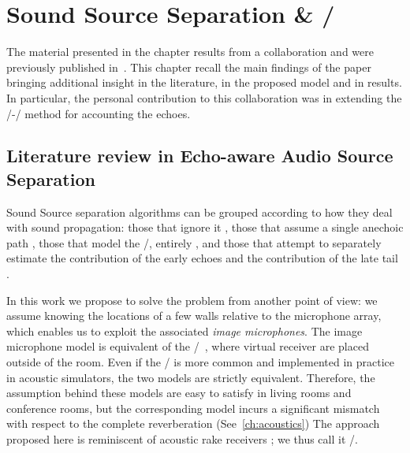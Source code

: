 \chapter{Sound Source Separation \& \SEPARAKEdef/}\label{chap:separake}

 \synopsisChSeparake

\mynewline
The material presented in the chapter results from a collaboration and were previously published in~\cite{scheibler2018separake}.
This chapter recall the main findings of the paper bringing additional insight in the literature, in the proposed model and in results.
In particular, the personal contribution to this collaboration was in extending the \EMdef/-\NMF/ method for accounting the echoes.

\section{Literature review in Echo-aware Audio Source Separation}
Sound Source separation algorithms can be grouped according to how they deal with sound propagation:
those that ignore it ,
those that assume a single anechoic path ,
those that model the \RTFs/, entirely ,
and those that attempt to separately estimate the contribution of the early echoes and the contribution of the late tail .

In this work we propose to solve the problem from another point of view:
we assume knowing the locations of a few walls relative to the microphone array, which enables us to exploit the associated \textit{image microphones}.
The image microphone model is equivalent of the \ISMdef/~, where virtual receiver are placed outside of the room.
Even if the \ISM/ is more common and implemented in practice in acoustic simulators, the two models are strictly equivalent.
Therefore, the assumption behind these models are easy to satisfy in living rooms and conference rooms, but the corresponding model incurs a significant mismatch with respect to the complete reverberation (See~\cref{ch:acoustics})
The approach proposed here is reminiscent of acoustic rake receivers ; we thus call it \SEPARAKEdef/.

